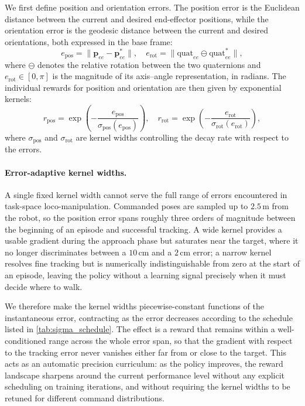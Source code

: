 We first define position and orientation errors. The position error is the Euclidean distance between the current and desired end-effector positions, while the orientation error is the geodesic distance between the current and desired orientations, both expressed in the base frame:
%
\begin{equation}
    e_{\text{pos}} = \lVert \boldsymbol{p}_{ee} - \boldsymbol{p}_{ee}^{*} \rVert, 
    \quad
    e_{\text{rot}} = \bigl\lVert \mathrm{quat}_{ee} \ominus \mathrm{quat}_{ee}^{*} \bigr\rVert,
    \label{eq:pos-and-rot-errors}
\end{equation}
%
where $\ominus$ denotes the relative rotation between the two quaternions and $e_{\text{rot}}\in[0,\pi]$ is the magnitude of its axis--angle representation, in radians. The individual rewards for position and orientation are then given by exponential kernels:
%
\begin{equation}
    r_{\text{pos}} = \exp\!\left(-\frac{e_{\text{pos}}}{\sigma_{\text{pos}}(e_{\text{pos}})}\right),
    \quad
    r_{\text{rot}} = \exp\!\left(-\frac{e_{\text{rot}}}{\sigma_{\text{rot}}(e_{\text{rot}})}\right),
    \label{eq:pos-rot-rew}
\end{equation}
%
where $\sigma_{\text{pos}}$ and $\sigma_{\text{rot}}$ are kernel widths controlling the decay rate with respect to the errors.

\paragraph{Error-adaptive kernel widths.} A single fixed kernel width cannot serve the full range of errors encountered in task-space loco-manipulation. Commanded poses are sampled up to $2.5\,$m from the robot, so the position error spans roughly three orders of magnitude between the beginning of an episode and successful tracking. A wide kernel provides a usable gradient during the approach phase but saturates near the target, where it no longer discriminates between a $10\,$cm and a $2\,$cm error; a narrow kernel resolves fine tracking but is numerically indistinguishable from zero at the start of an episode, leaving the policy without a learning signal precisely when it must decide where to walk.

We therefore make the kernel widths piecewise-constant functions of the instantaneous error, contracting as the error decreases according to the schedule listed in \cref{tab:sigma_schedule}. The effect is a reward that remains within a well-conditioned range across the whole error span, so that the gradient with respect to the tracking error never vanishes either far from or close to the target. This acts as an automatic precision curriculum: as the policy improves, the reward landscape sharpens around the current performance level without any explicit scheduling on training iterations, and without requiring the kernel widths to be retuned for different command distributions.

